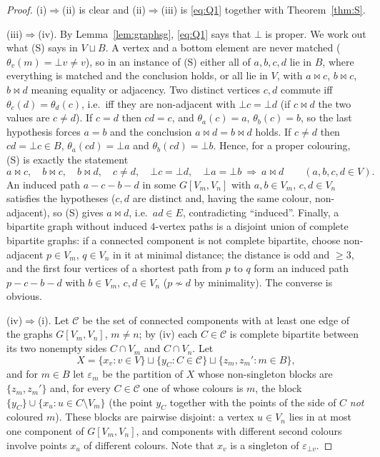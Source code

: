 \documentclass[11pt]{amsart}
\theoremstyle{definition}
\begin{document}
\begin{proof}
(i)$\Rightarrow$(ii) is clear and (ii)$\Rightarrow$(iii) is \eqref{eq:Q1} together with Theorem~\ref{thm:S}.

(iii)$\Rightarrow$(iv). By Lemma~\ref{lem:graphsg}, \eqref{eq:Q1} says that $\bot$ is proper. We work out what (S) says in $V\sqcup B$. A vertex and a bottom element are never matched ($\theta_v(m)=\bot v\ne v$), so in an instance of (S) either all of $a,b,c,d$ lie in $B$, where everything is matched and the conclusion holds, or all lie in $V$, with $a\bowtie c$, $b\bowtie c$, $b\bowtie d$ meaning equality or adjacency. Two distinct vertices $c,d$ commute iff $\theta_c(d)=\theta_d(c)$, i.e.\ iff they are non-adjacent with $\bot c=\bot d$ (if $c\bowtie d$ the two values are $c\ne d$). If $c=d$ then $cd=c$, and $\theta_a(c)=a$, $\theta_b(c)=b$, so the last hypothesis forces $a=b$ and the conclusion $a\bowtie d=b\bowtie d$ holds. If $c\ne d$ then $cd=\bot c\in B$, $\theta_a(cd)=\bot a$ and $\theta_b(cd)=\bot b$. Hence, for a proper colouring, (S) is exactly the statement
\[
a\bowtie c,\quad b\bowtie c,\quad b\bowtie d,\quad c\ne d,\quad \bot c=\bot d,\quad \bot a=\bot b\ \Longrightarrow\ a\bowtie d\qquad(a,b,c,d\in V).
\]
An induced path $a-c-b-d$ in some $G[V_m,V_n]$ with $a,b\in V_m$, $c,d\in V_n$ satisfies the hypotheses ($c,d$ are distinct and, having the same colour, non-adjacent), so (S) gives $a\bowtie d$, i.e.\ $ad\in E$, contradicting ``induced''. Finally, a bipartite graph without induced $4$-vertex paths is a disjoint union of complete bipartite graphs: if a connected component is not complete bipartite, choose non-adjacent $p\in V_m$, $q\in V_n$ in it at minimal distance; the distance is odd and $\ge3$, and the first four vertices of a shortest path from $p$ to $q$ form an induced path $p-c-b-d$ with $b\in V_m$, $c,d\in V_n$ ($p\not\sim d$ by minimality). The converse is obvious.

(iv)$\Rightarrow$(i). Let $\mathcal C$ be the set of connected components with at least one edge of the graphs $G[V_m,V_n]$, $m\ne n$; by (iv) each $C\in\mathcal C$ is complete bipartite between its two nonempty sides $C\cap V_m$ and $C\cap V_n$. Let
\[
X=\{x_v:v\in V\}\sqcup\{y_C:C\in\mathcal C\}\sqcup\{z_m,z_m':m\in B\},
\]
and for $m\in B$ let $\varepsilon_m$ be the partition of $X$ whose non-singleton blocks are $\{z_m,z_m'\}$ and, for every $C\in\mathcal C$ one of whose colours is $m$, the block $\{y_C\}\cup\{x_u:u\in C\setminus V_m\}$ (the point $y_C$ together with the points of the side of $C$ \emph{not} coloured $m$). These blocks are pairwise disjoint: a vertex $u\in V_n$ lies in at most one component of $G[V_m,V_n]$, and components with different second colours involve points $x_u$ of different colours. Note that $x_v$ is a singleton of $\varepsilon_{\bot v}$.


\end{proof}
\end{document}
